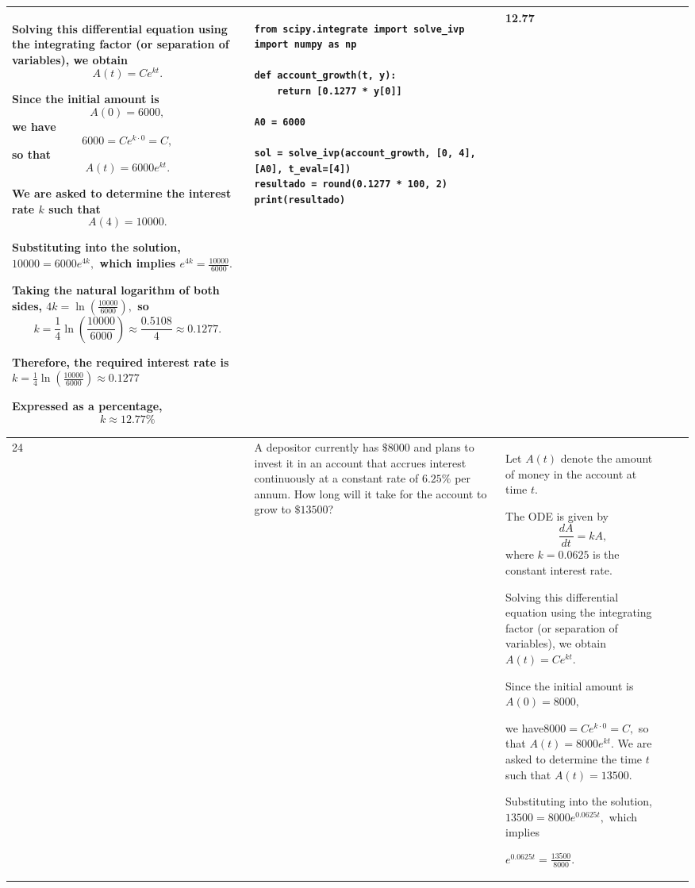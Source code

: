 \documentclass[a4paper,12pt]{article}
\begin{document}
\begin{longtable}{|p{0.3cm}|p{}|p{10cm}|p{}|p{1.5cm}|}
Solving this differential equation using the integrating factor (or separation of variables), we obtain
\[
A(t)=Ce^{kt}.
\]

Since the initial amount is
\[
A(0)=6000,
\]
we have
\[
6000=Ce^{k\cdot0}=C,
\]
so that
\[
A(t)=6000e^{kt}.
\]

We are asked to determine the interest rate \(k\) such that
\[
A(4)=10000.
\]

Substituting into the solution,$
10000=6000e^{4k},$
which implies $e^{4k}=\frac{10000}{6000}.$

Taking the natural logarithm of both sides, $4k=\ln\left(\frac{10000}{6000}\right),$
so
\[
k=\frac{1}{4}\ln\left(\frac{10000}{6000}\right)
   \approx\frac{0.5108}{4}
   \approx0.1277.
\]

Therefore, the required interest rate is 
$k=\frac{1}{4}\ln\left(\frac{10000}{6000}\right)\approx0.1277$

Expressed as a percentage,
\[
k\approx12.77\%
\] & \begin{verbatim}
from scipy.integrate import solve_ivp
import numpy as np

def account_growth(t, y):
    return [0.1277 * y[0]]

A0 = 6000

sol = solve_ivp(account_growth, [0, 4], [A0], t_eval=[4])
resultado = round(0.1277 * 100, 2)
print(resultado) \end{verbatim}& 12.77   \\ \hline 
24            & A depositor currently has \(\$8000\) and plans to invest it in an account that accrues interest continuously at a constant rate of \(6.25\%\) per annum. How long will it take for the account to grow to \(\$13500\)?
              & Let \(A(t)\) denote the amount of money in the account at time \(t\).

The ODE is given by
\[
\frac{dA}{dt}=kA,
\]
where \(k=0.0625\) is the constant interest rate.

Solving this differential equation using the integrating factor (or separation of variables), we obtain
$
A(t)=Ce^{kt}.$

Since the initial amount is$A(0)=8000,$

we have$8000=Ce^{k\cdot0}=C,$
so that $A(t)=8000e^{kt}.$
We are asked to determine the time \(t\) such that $A(t)=13500.$

Substituting into the solution,$
13500=8000e^{0.0625t},$ which implies

$e^{0.0625t}=\frac{13500}{8000}.$


\end{longtable}
\end{document}
